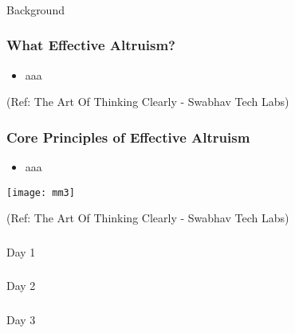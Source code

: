\begin{frame}[fragile]\frametitle{}
\begin{center}
{\Large Background}
\end{center}
\end{frame}

\begin{frame}[fragile]\frametitle{What Effective Altruism?}
      \begin{itemize}
        \item aaa
      \end{itemize}
	  
{\tiny (Ref: The Art Of Thinking Clearly - Swabhav Tech Labs)}  	  
  
\end{frame}

\begin{frame}[fragile]\frametitle{Core Principles of Effective Altruism}
      \begin{itemize}
        \item aaa
      \end{itemize}
	  
	\begin{center}
	\texttt{[image: mm3]}
	\end{center}
	
{\tiny (Ref: The Art Of Thinking Clearly - Swabhav Tech Labs)}  	  
\end{frame}

\begin{frame}[fragile]\frametitle{}
\begin{center}
{\Large Day 1}
\end{center}
\end{frame}

\begin{frame}[fragile]\frametitle{}
\begin{center}
{\Large Day 2}
\end{center}
\end{frame}


\begin{frame}[fragile]\frametitle{}
\begin{center}
{\Large Day 3}
\end{center}
\end{frame}



